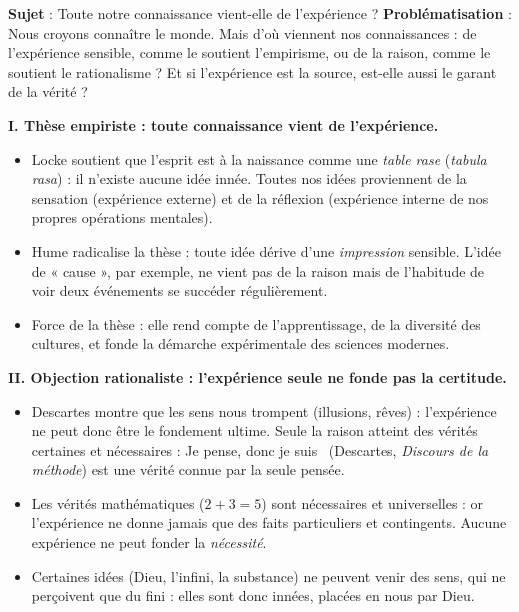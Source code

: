 \documentclass[11pt]{article}
\begin{document}
\begin{exoresolu}
\textbf{Sujet} : Toute notre connaissance vient-elle de l'expérience ?
\tcblower
\textbf{Problématisation} : Nous croyons connaître le monde. Mais d'où viennent nos connaissances : de l'expérience sensible, comme le soutient l'empirisme, ou de la raison, comme le soutient le rationalisme ? Et si l'expérience est la source, est-elle aussi le garant de la vérité ?

\textbf{I. Thèse empiriste : toute connaissance vient de l'expérience.}
\begin{itemize}
\item Locke soutient que l'esprit est à la naissance comme une \emph{table rase} (\emph{tabula rasa}) : il n'existe aucune idée innée. Toutes nos idées proviennent de la sensation (expérience externe) et de la réflexion (expérience interne de nos propres opérations mentales).
\item Hume radicalise la thèse : toute idée dérive d'une \emph{impression} sensible. L'idée de « cause », par exemple, ne vient pas de la raison mais de l'habitude de voir deux événements se succéder régulièrement.
\item Force de la thèse : elle rend compte de l'apprentissage, de la diversité des cultures, et fonde la démarche expérimentale des sciences modernes.
\end{itemize}

\textbf{II. Objection rationaliste : l'expérience seule ne fonde pas la certitude.}
\begin{itemize}
\item Descartes montre que les sens nous trompent (illusions, rêves) : l'expérience ne peut donc être le fondement ultime. Seule la raison atteint des vérités certaines et nécessaires : \guillemotleft Je pense, donc je suis \guillemotright\ (Descartes, \emph{Discours de la méthode}) est une vérité connue par la seule pensée.
\item Les vérités mathématiques ($2 + 3 = 5$) sont nécessaires et universelles : or l'expérience ne donne jamais que des faits particuliers et contingents. Aucune expérience ne peut fonder la \emph{nécessité}.
\item Certaines idées (Dieu, l'infini, la substance) ne peuvent venir des sens, qui ne perçoivent que du fini : elles sont donc innées, placées en nous par Dieu.
\end{itemize}


\end{exoresolu}
\end{document}
